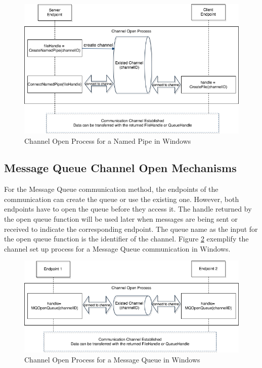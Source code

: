 \begin{figure}[H]
\centerline{\includegraphics[scale=0.5]{Figures/namepipechannelopen}}
 \caption{Channel Open Process for a Named Pipe in Windows}
\label{namedpipeopen}
\end{figure}
    
\subsection{Message Queue Channel Open Mechanisms} 
For the Message Queue communication method, the endpoints of the communication can create the queue or use the existing one. However, both endpoints have to open the queue before they access it. The handle returned by the open queue function will be used later when messages are being sent or received to indicate the corresponding endpoint. The queue name as the input for the open queue function is the identifier of the channel. Figure  \ref{msmqopen} exemplify the channel set up process for a Message Queue communication in Windows.
\begin{figure}[H]
\centerline{\includegraphics[scale=0.5]{Figures/msmqchannelopen}}
 \caption{Channel Open Process for a Message Queue in Windows}
\label{msmqopen}
\end{figure}

